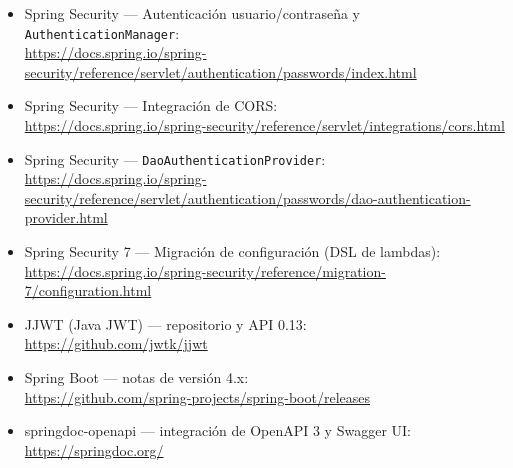 \documentclass[11pt]{article}
\begin{document}
\begin{itemize}[leftmargin=1.4em,itemsep=4pt,topsep=2pt]
\item Spring Security --- Autenticación usuario/contraseña y \texttt{AuthenticationManager}: \\ \url{https://docs.spring.io/spring-security/reference/servlet/authentication/passwords/index.html}
\item Spring Security --- Integración de CORS: \\ \url{https://docs.spring.io/spring-security/reference/servlet/integrations/cors.html}
\item Spring Security --- \texttt{DaoAuthenticationProvider}: \\ \url{https://docs.spring.io/spring-security/reference/servlet/authentication/passwords/dao-authentication-provider.html}
\item Spring Security 7 --- Migración de configuración (DSL de lambdas): \\ \url{https://docs.spring.io/spring-security/reference/migration-7/configuration.html}
\item JJWT (Java JWT) --- repositorio y API 0.13: \\ \url{https://github.com/jwtk/jjwt}
\item Spring Boot --- notas de versión 4.x: \\ \url{https://github.com/spring-projects/spring-boot/releases}
\item springdoc-openapi --- integración de OpenAPI 3 y Swagger UI: \\ \url{https://springdoc.org/}
\end{itemize}
\end{document}
